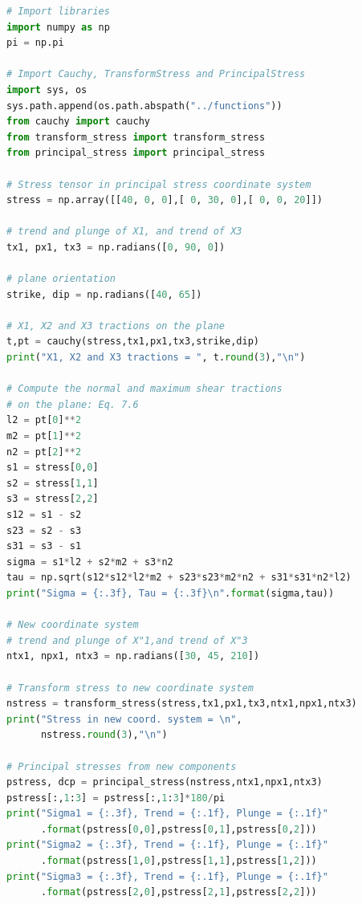 \documentclass[a4paper , 12pt]{book}
\begin{document}
\begin{center}
\begin{lstlisting}[language=Python, frame=single]
# Import libraries
import numpy as np
pi = np.pi

# Import Cauchy, TransformStress and PrincipalStress
import sys, os
sys.path.append(os.path.abspath("../functions"))
from cauchy import cauchy 
from transform_stress import transform_stress
from principal_stress import principal_stress

# Stress tensor in principal stress coordinate system
stress = np.array([[40, 0, 0],[ 0, 30, 0],[ 0, 0, 20]])

# trend and plunge of X1, and trend of X3
tx1, px1, tx3 = np.radians([0, 90, 0])

# plane orientation
strike, dip = np.radians([40, 65])

# X1, X2 and X3 tractions on the plane
t,pt = cauchy(stress,tx1,px1,tx3,strike,dip)
print("X1, X2 and X3 tractions = ", t.round(3),"\n")

# Compute the normal and maximum shear tractions 
# on the plane: Eq. 7.6
l2 = pt[0]**2
m2 = pt[1]**2
n2 = pt[2]**2
s1 = stress[0,0]
s2 = stress[1,1]
s3 = stress[2,2]
s12 = s1 - s2
s23 = s2 - s3
s31 = s3 - s1
sigma = s1*l2 + s2*m2 + s3*n2
tau = np.sqrt(s12*s12*l2*m2 + s23*s23*m2*n2 + s31*s31*n2*l2)
print("Sigma = {:.3f}, Tau = {:.3f}\n".format(sigma,tau))

# New coordinate system
# trend and plunge of X"1,and trend of X"3
ntx1, npx1, ntx3 = np.radians([30, 45, 210])

# Transform stress to new coordinate system
nstress = transform_stress(stress,tx1,px1,tx3,ntx1,npx1,ntx3)
print("Stress in new coord. system = \n", 
      nstress.round(3),"\n")

# Principal stresses from new components
pstress, dcp = principal_stress(nstress,ntx1,npx1,ntx3)
pstress[:,1:3] = pstress[:,1:3]*180/pi
print("Sigma1 = {:.3f}, Trend = {:.1f}, Plunge = {:.1f}"
      .format(pstress[0,0],pstress[0,1],pstress[0,2]))
print("Sigma2 = {:.3f}, Trend = {:.1f}, Plunge = {:.1f}"
      .format(pstress[1,0],pstress[1,1],pstress[1,2]))
print("Sigma3 = {:.3f}, Trend = {:.1f}, Plunge = {:.1f}"
      .format(pstress[2,0],pstress[2,1],pstress[2,2]))
\end{lstlisting}
\end{center}
\end{document}
